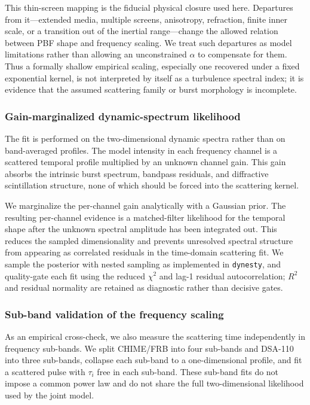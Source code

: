 This thin-screen mapping is the fiducial physical closure used here. Departures
from it---extended media, multiple screens, anisotropy, refraction, finite inner
scale, or a transition out of the inertial range---change the allowed relation
between PBF shape and frequency scaling. We treat such departures as model
limitations rather than allowing an unconstrained $\alpha$ to compensate for
them. Thus a formally shallow empirical scaling, especially one recovered under
a fixed exponential kernel, is not interpreted by itself as a turbulence spectral
index; it is evidence that the assumed scattering family or burst morphology is
incomplete.

\subsubsection{Gain-marginalized dynamic-spectrum likelihood}
\label{sec:beta-gainmarg}

The fit is performed on the two-dimensional dynamic spectra rather than on
band-averaged profiles. The model intensity in each frequency channel is a
scattered temporal profile multiplied by an unknown channel gain. This gain
absorbs the intrinsic burst spectrum, bandpass residuals, and diffractive
scintillation structure, none of which should be forced into the scattering
kernel.

We marginalize the per-channel gain analytically with a Gaussian prior. The
resulting per-channel evidence is a matched-filter likelihood for the temporal
shape after the unknown spectral amplitude has been integrated out. This reduces
the sampled dimensionality and prevents unresolved spectral structure from
appearing as correlated residuals in the time-domain scattering fit. We sample
the posterior with nested sampling as implemented in \texttt{dynesty}, and
quality-gate each fit using the reduced $\chi^2$ and lag-1 residual
autocorrelation; $R^2$ and residual normality are retained as diagnostic rather
than decisive gates.

\subsubsection{Sub-band validation of the frequency scaling}
\label{sec:beta-subband}

As an empirical cross-check, we also measure the scattering time independently in
frequency sub-bands. We split CHIME/FRB into four sub-bands and DSA-110 into
three sub-bands, collapse each sub-band to a one-dimensional profile, and fit a
scattered pulse with $\tau_i$ free in each sub-band. These sub-band fits do not
impose a common power law and do not share the full two-dimensional likelihood
used by the joint model.


